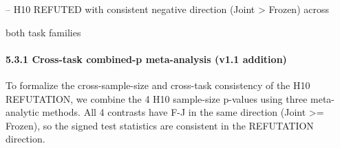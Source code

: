 \documentclass[11pt]{article}
\begin{document}
-- H10 REFUTED with consistent negative direction (Joint \textgreater{}
Frozen) across

both task families

\paragraph{5.3.1 Cross-task combined-p meta-analysis (v1.1
addition)}\label{cross-task-combined-p-meta-analysis-v1.1-addition}

To formalize the cross-sample-size and cross-task consistency of the H10
REFUTATION, we combine the 4 H10 sample-size p-values using three
meta-analytic methods. All 4 contrasts have F-J in the same direction
(Joint \textgreater= Frozen), so the signed test statistics are
consistent in the REFUTATION direction.
\end{document}
